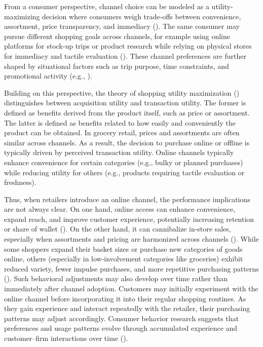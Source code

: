 From a consumer perspective, channel choice can be modeled as a utility-maximizing decision where consumers weigh trade-offs between convenience, assortment, price transparency, and immediacy (\cite{Ansari2008-qz}). The same consumer may pursue different shopping goals across channels, for example using online platforms for stock-up trips or product research while relying on physical stores for immediacy and tactile evaluation (\cite{Campo2020-xu}). These channel preferences are further shaped by situational factors such as trip purpose, time constraints, and promotional activity (e.g., \cite{Neslin2006-xv, Van_Nierop2011-wt}).

Building on this perspective, the theory of shopping utility maximization (\cite{Campo2020-xu}) distinguishes between acquisition utility and transaction utility. The former is defined as benefits derived from the product itself, such as price or assortment. The latter is defined as benefits related to how easily and conveniently the product can be obtained. In grocery retail, prices and assortments are often similar across channels. As a result, the decision to purchase online or offline is typically driven by perceived transaction utility. Online channels typically enhance convenience for certain categories (e.g., bulky or planned purchases) while reducing utility for others (e.g., products requiring tactile evaluation or freshness).

Thus, when retailers introduce an online channel, the performance implications are not always clear. On one hand, online access can enhance convenience, expand reach, and improve customer experience, potentially increasing retention or share of wallet (\cite{Verhoef2007-gm}). On the other hand, it can cannibalize in-store sales, especially when assortments and pricing are harmonized across channels (\cite{Avery2012-ex,Gensler2007-cg}). While some shoppers expand their basket sizes or purchase new categories of goods online, others (especially in low-involvement categories like groceries) exhibit reduced variety, fewer impulse purchases, and more repetitive purchasing patterns (\cite{Chintala2023-kv}). Such behavioral adjustments may also develop over time rather than immediately after channel adoption. Customers may initially experiment with the online channel before incorporating it into their regular shopping routines. As they gain experience and interact repeatedly with the retailer, their purchasing patterns may adjust accordingly. Consumer behavior research suggests that preferences and usage patterns evolve through accumulated experience and customer–firm interactions over time (\cite{Zhang2021-os}).

